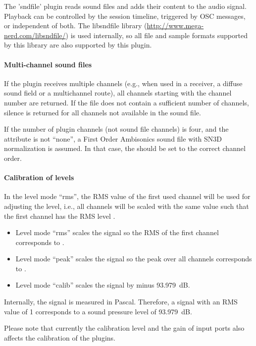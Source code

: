 The 'sndfile' plugin reads sound files and adds their content to the audio signal. Playback can be controlled by the session timeline, triggered by OSC messages, or independent of both. The libsndfile library (\url{http://www.mega-nerd.com/libsndfile/}) is used internally, so all file and sample formats supported by this library are also supported by this plugin.




\paragraph{Multi-channel sound files}
%
If the plugin receives multiple channels (e.g., when used in a receiver, a diffuse sound field or a multichannel route), all channels starting with the channel number  are returned. If the file does not contain a sufficient number of channels, silence is returned for all channels not available in the sound file.

If the number of plugin channels (not sound file channels) is four, and the attribute  is not ``none'', a First Order Ambisonics sound file with SN3D normalization is assumed. In that case, the  should be set to the correct channel order.

\paragraph{Calibration of levels}
%
In the level mode ``rms'', the RMS value of the first used channel
will be used for adjusting the level, i.e., all channels will be
scaled with the same value such that the first channel has the
RMS level .
\begin{itemize}
\item Level mode ``rms'' scales the signal so the RMS of the first channel corresponds to .

\item Level mode ``peak'' scales the signal so the peak over all channels corresponds to .

\item Level mode ``calib'' scales the signal by  minus 93.979~dB.
\end{itemize}
Internally, the signal is measured in Pascal. Therefore, a signal with an RMS value of 1 corresponds to a sound pressure level of 93.979~dB.

Please note that currently the calibration level and the gain of input ports also affects the calibration of the plugins.

